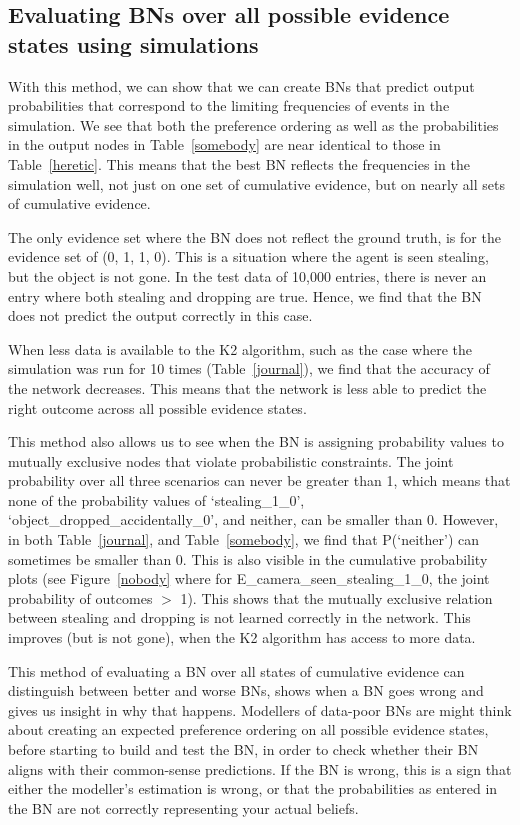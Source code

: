 \documentclass[12pt]{article}
\begin{document}
\subsection{Evaluating BNs over all possible evidence states using simulations}
With this method, we can show that we can create BNs that predict output probabilities that correspond to the limiting frequencies of events in the simulation. We see that both the preference ordering as well as the probabilities in the output nodes in Table~\ref{somebody} are near identical to those in Table~\ref{heretic}. This means that the best BN reflects the frequencies in the simulation well, not just on one set of cumulative evidence, but on nearly all sets of cumulative evidence. 

The only evidence set where the BN does not reflect the ground truth, is for the evidence set of (0, 1, 1, 0). This is a situation where the agent is seen stealing, but the object is not gone. In the test data of 10,000 entries, there is never an entry where both stealing and dropping are true. Hence, we find that the BN does not predict the output correctly in this case. 

When less data is available to the K2 algorithm, such as the case where the simulation was run for 10 times (Table~\ref{journal}), we find that the accuracy of the network decreases. This means that the network is less able to predict the right outcome across all possible evidence states.

This method also allows us to see when the BN is assigning probability values to mutually exclusive nodes that violate probabilistic constraints. The joint probability over all three scenarios can never be greater than 1, which means that none of the probability values of `stealing\_1\_0', `object\_dropped\_accidentally\_0', and neither, can be smaller than 0. However, in both Table~\ref{journal}, and Table~\ref{somebody}, we find that P(`neither') can sometimes be smaller than 0. This is also visible in the cumulative probability plots (see Figure~\ref{nobody} where for E\_camera\_seen\_stealing\_1\_0, the joint probability of outcomes $>$ 1). This shows that the mutually exclusive relation between stealing and dropping is not learned correctly in the network. This improves (but is not gone), when the K2 algorithm has access to more data.


This method of evaluating a BN over all states of cumulative evidence can distinguish between better and worse BNs, shows when a BN goes wrong and gives us insight in why that happens. Modellers of data-poor BNs are might think about creating an expected preference ordering on all possible evidence states, before starting to build and test the BN, in order to check whether their BN aligns with their common-sense predictions. If the BN is wrong, this is a sign that either the modeller's estimation is wrong, or that the probabilities as entered in the BN are not correctly representing your actual beliefs.
\end{document}
